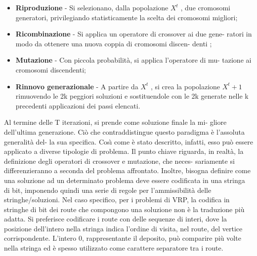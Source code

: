 \documentclass[]{article}
\begin{document}
\begin{itemize}
\item \textbf{Riproduzione} - Si selezionano, dalla popolazione \emph{$X^t$} , due cromosomi
generatori, privilegiando statisticamente la scelta dei cromosomi
migliori;
\item \textbf{Ricombinazione} - Si applica un operatore di crossover ai due gene-
ratori in modo da ottenere una nuova coppia di cromosomi discen-
denti ;
\item  \textbf{Mutazione} - Con piccola probabilità, si applica l’operatore di mu-
tazione ai cromosomi discendenti;
\item  \textbf{Rinnovo generazionale} - A partire da \emph{$X^t$} , si crea la popolazione \emph{$X^t+1$} rimuovendo le 2k peggiori soluzioni e sostituendole con le 2k generate nelle k precedenti applicazioni dei passi elencati.
\end{itemize}
Al termine delle T iterazioni, si prende come soluzione finale la mi-
gliore dell’ultima generazione.
Ciò che contraddistingue questo paradigma è l’assoluta generalità del-
la sua specifica. Cosı̀ come è stato descritto, infatti, esso può essere
applicato a diverse tipologie di problema. Il punto chiave riguarda, in
realtà, la definizione degli operatori di crossover e mutazione, che neces-
sariamente si differenzieranno a seconda del problema affrontato. Inoltre,
bisogna definire come una soluzione ad un determinato problema deve
essere codificata in una stringa di bit, imponendo quindi una serie di
regole per l’ammissibilità delle stringhe/soluzioni.
Nel caso specifico, per i problemi di VRP, la codifica in stringhe di
bit dei route che compongono una soluzione non è la traduzione più
adatta. Si preferisce codificare i route con delle sequenze di interi, dove
la posizione dell’intero nella stringa indica l’ordine di visita, nel route,
del vertice corrispondente. L’intero 0, rappresentante il deposito, può
comparire più volte nella stringa ed è spesso utilizzato come carattere
separatore tra i route.



\end{document}
